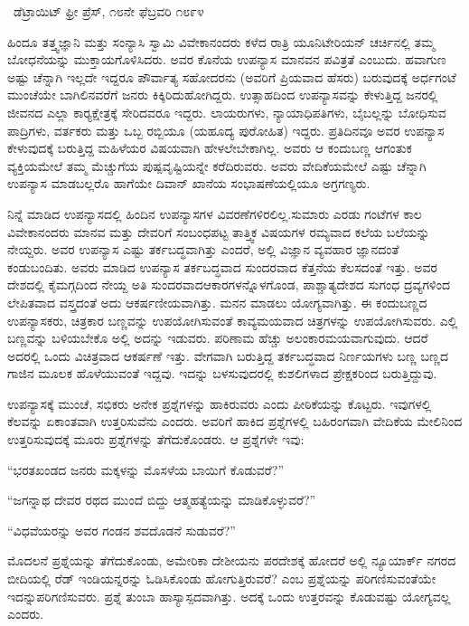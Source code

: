 ~\hfill{\fontsize{11pt}{13.75pt}\selectfont ಡೆಟ್ರಾಯಿಟ್ ಫ್ರೀ ಪ್ರೆಸ್, ೧೮ನೇ ಫೆಬ್ರವರಿ ೧೮೯೪ }

 ಹಿಂದೂ ತತ್ತ್ವಜ್ಞಾನಿ ಮತ್ತು ಸಂನ್ಯಾಸಿ ಸ್ವಾಮಿ ವಿವೇಕಾನಂದರು ಕಳೆದ ರಾತ್ರಿ ಯೂನಿಟೇರಿಯನ್ ಚರ್ಚಿನಲ್ಲಿ ತಮ್ಮ ಬೋಧನೆಯನ್ನು ಮುಕ್ತಾಯಗೊಳಿಸಿದರು. ಅವರ ಕೊನೆಯ ಉಪನ್ಯಾಸ ಮಾನವನ ಪವಿತ್ರತೆ ಎಂಬುದು. ಹವಾಗುಣ ಅಷ್ಟು ಚೆನ್ನಾಗಿ ಇಲ್ಲದೇ ಇದ್ದರೂ ಪೌರ್ವಾತ್ಯ ಸಹೋದರನು (ಅವರಿಗೆ ಪ್ರಿಯವಾದ ಹೆಸರು) ಬರುವುದಕ್ಕೆ ಅರ್ಧಗಂಟೆ ಮುಂಚೆಯೇ ಬಾಗಿಲಿನವರೆಗೆ ಜನರು ಕಿಕ್ಕಿರಿದುಹೋಗಿದ್ದರು. ಉತ್ಸಾಹದಿಂದ ಉಪನ್ಯಾಸವನ್ನು ಕೇಳುತ್ತಿದ್ದ ಜನರಲ್ಲಿ ಜೀವನದ ಎಲ್ಲಾ ಕಾರ‍್ಯಕ್ಷೇತ್ರಕ್ಕೆ ಸೇರಿದವರೂ ಇದ್ದರು. ಲಾಯರುಗಳು, ನ್ಯಾಯಾಧಿಪತಿಗಳು, ಬೈಬಲ್ಲನ್ನು ಬೋಧಿಸುವ ಪಾದ್ರಿಗಳು, ವರ್ತಕರು ಮತ್ತು ಒಬ್ಬ ರಬ್ಬಿಯೂ (ಯಹೂದ್ಯ ಪುರೋಹಿತ) ಇದ್ದರು. ಪ್ರತಿದಿನವೂ ಅವರ ಉಪನ್ಯಾಸ ಕೇಳುವುದಕ್ಕೆ ಬರುತ್ತಿದ್ದ ಮಹಿಳೆಯರ ವಿಷಯವಾಗಿ ಹೇಳಲೇಬೇಕಾಗಿಲ್ಲ. ಅವರು ಆ ಕಂದುಬಣ್ಣ ಆಗಂತುಕ ವ್ಯಕ್ತಿಯಮೇಲೆ ತಮ್ಮ ಮೆಚ್ಚುಗೆಯ ಪುಷ್ಪವೃಷ್ಟಿಯನ್ನೇ ಕರೆದಿರುವರು. ಅವರು ವೇದಿಕೆಯಮೇಲೆ ಎಷ್ಟು ಚೆನ್ನಾಗಿ ಉಪನ್ಯಾಸ ಮಾಡಬಲ್ಲರೊ ಹಾಗೆಯೇ ದಿವಾನ್ ಖಾನೆಯ ಸಂಭಾಷಣೆಯಲ್ಲಿಯೂ ಅಗ್ರಗಣ್ಯರು. 

 ನಿನ್ನೆ ಮಾಡಿದ ಉಪನ್ಯಾಸದಲ್ಲಿ ಹಿಂದಿನ ಉಪನ್ಯಾಸಗಳ ವಿವರಣೆಗಳಿರಲಿಲ್ಲ.\break ಸುಮಾರು ಎರಡು ಗಂಟೆಗಳ ಕಾಲ ವಿವೇಕಾನಂದರು ಮಾನವ ಮತ್ತು ದೇವರಿಗೆ ಸಂಬಂಧಪಟ್ಟ ತಾತ್ತ್ವಿಕ ವಿಷಯಗಳ ರಮ್ಯವಾದ ಕಲೆಯ ಬಲೆಯನ್ನು ನೇಯ್ದರು. ಅವರ ಉಪನ್ಯಾಸ ಎಷ್ಟು ತರ್ಕಬದ್ಧವಾಗಿತ್ತು ಎಂದರೆ, ಅಲ್ಲಿ ವಿಜ್ಞಾನ ವ್ಯವಹಾರ ಜ್ಞಾನದಂತೆ ಕಂಡುಬಂದಿತು. ಅವರು ಮಾಡಿದ ಉಪನ್ಯಾಸ ತರ್ಕಬದ್ಧವಾದ ಸುಂದರವಾದ ಕೆತ್ತನೆಯ ಕೆಲಸದಂತೆ ಇತ್ತು. ಅವರ ದೇಶದಲ್ಲಿ ಕೈಮಗ್ಗದಿಂದ ನೇಯ್ದ ಅತಿ ಸುಂದರವಾದ\break ಆಕಾರಗಳನ್ನೊಳಗೊಂಡ, ಪಾಶ್ಚಾತ್ಯದೇಶದ ಸುಗಂಧ ದ್ರವ್ಯಗಳಿಂದ ಲೇಪಿತವಾದ ವಸ್ತ್ರದಂತೆ ಅದು ಆಕರ್ಷಣೀಯವಾಗಿತ್ತು. ಮನನ ಮಾಡಲು ಯೋಗ್ಯವಾಗಿತ್ತು. ಈ ಕಂದುಬಣ್ಣದ ಉಪನ್ಯಾಸಕರು, ಚಿತ್ರಕಾರ ಬಣ್ಣವನ್ನು ಉಪಯೋಗಿಸುವಂತೆ ಕಾವ್ಯಮಯವಾದ ಚಿತ್ರಗಳನ್ನು ಉಪಯೋಗಿಸುವರು. ಎಲ್ಲಿ ಬಣ್ಣವನ್ನು ಬಳಿಯಬೇಕೊ ಅಲ್ಲಿ ಅದನ್ನು ಇಡುವರು. ಪರಿಣಾಮ ಹೆಚ್ಚು ಅಲಂಕಾರಮಯವಾಗುವುದು. ಆದರೆ ಅದರಲ್ಲಿ ಒಂದು ವಿಚಿತ್ರವಾದ ಆಕರ್ಷಣೆ ಇತ್ತು. ವೇಗವಾಗಿ ಬರುತ್ತಿದ್ದ ತರ್ಕಬದ್ಧವಾದ ನಿರ್ಣಯಗಳು ಬಣ್ಣ ಬಣ್ಣದ ಗಾಜಿನ ಮೂಲಕ ಹೊಳೆಯುವಂತೆ ಇದ್ದವು. ಇದನ್ನು ಬಳಸುವುದರಲ್ಲಿ ಕುಶಲಿಗಳಾದ ಪ್ರೇಕ್ಷಕರಿಂದ ಬರುತ್ತಿದ್ದುವು. 

 ಉಪನ್ಯಾಸಕ್ಕೆ ಮುಂಚೆ, ಸಭಿಕರು ಅನೇಕ ಪ್ರಶ್ನೆಗಳನ್ನು ಹಾಕಿರುವರು ಎಂದು ಪೀಠಿಕೆಯನ್ನು ಕೊಟ್ಟರು. ಇವುಗಳಲ್ಲಿ ಕೆಲವನ್ನು ಏಕಾಂತವಾಗಿ ಉತ್ತರಿಸುವೆನು ಎಂದರು. ಅವರಿಗೆ ಹಾಕಿದ ಪ್ರಶ್ನೆಗಳಲ್ಲಿ ಬಹಿರಂಗವಾಗಿ ವೇದಿಕೆಯ ಮೇಲಿನಿಂದ ಉತ್ತರಿಸುವುದಕ್ಕೆ ಮೂರು ಪ್ರಶ್ನೆಗಳನ್ನು ತೆಗೆದುಕೊಂಡರು. ಆ ಪ್ರಶ್ನೆಗಳೇ ಇವು: 

 “ಭರತಖಂಡದ ಜನರು ಮಕ್ಕಳನ್ನು ಮೊಸಳೆಯ ಬಾಯಿಗೆ ಕೊಡುವರೆ?” 

 “ಜಗನ್ನಾಥ ದೇವರ ರಥದ ಮುಂದೆ ಬಿದ್ದು ಆತ್ಮಹತ್ಯೆಯನ್ನು ಮಾಡಿಕೊಳ್ಳುವರೆ?” 

 “ವಿಧವೆಯರನ್ನು ಅವರ ಗಂಡನ ಶವದೊಡನೆ ಸುಡುವರೆ?” 

 ಮೊದಲನೆ ಪ್ರಶ್ನೆಯನ್ನು ತೆಗೆದುಕೊಂಡು, ಅಮೇರಿಕಾ ದೇಶೀಯನು ಪರದೇಶಕ್ಕೆ ಹೋದರೆ ಅಲ್ಲಿ ನ್ಯೂಯಾರ್ಕ್ ನಗರದ ಬೀದಿಯಲ್ಲಿ ರೆಡ್ ಇಂಡಿಯನ್ನರನ್ನು ಓಡಿಸಿಕೊಂಡು ಹೋಗುತ್ತಿರುವರೆ? ಎಂಬ ಪ್ರಶ್ನೆಯನ್ನು ಪರಿಗಣಿಸುವಂತೆಯೇ ಇದನ್ನು\break ಪರಿಗಣಿಸುವರು. ಪ್ರಶ್ನೆ ತುಂಬಾ ಹಾಸ್ಯಾಸ್ಪದವಾಗಿತ್ತು. ಅದಕ್ಕೆ ಒಂದು ಉತ್ತರವನ್ನು ಕೊಡುವಷ್ಟು ಯೋಗ್ಯವಲ್ಲ ಎಂದರು. 

